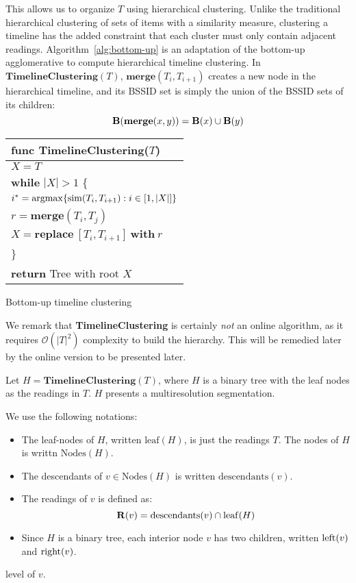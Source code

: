 This allows us to organize $T$ using hierarchical clustering.
Unlike the traditional hierarchical clustering of sets of items with a
similarity measure, clustering a timeline has the added constraint that each
cluster must only contain adjacent readings.
Algorithm~\ref{alg:bottom-up} is an
adaptation of the bottom-up agglomerative to compute hierarchical timeline
clustering.  In $\mathbf{TimelineClustering}(T)$, 
$\mathbf{merge}(T_i, T_{i+1})$ creates a new node in the hierarchical timeline,
and its BSSID set is simply the union of the BSSID sets of its children:
$$\mathbf{B}(\mathbf{merge}(x, y)) = \mathbf{B}(x)\cup\mathbf{B}(y)$$ 

\begin{algorithm}[t]
    \centering
\begin{tabular}{|l|}\hline
    func {\bf TimelineClustering}($T$) \\\hline
    $X = T$ \\
    {\bf while} $|X| > 1$ \{ \\
        \RRR $i^* = \mathrm{argmax}\{\mathrm{sim}(T_i,T_{i+1}) : i\in [1, |X|]\}$ \\
        \RRR $r = \mathbf{merge}(T_i, T_j)$ \\
        \RRR $X = \mathbf{replace}\ [T_i, T_{i+1}]\ \mathbf{with}\ r$\\
    \}\\ 
    {\bf return} Tree with root $X$\\ \hline
\end{tabular}
\vspace{0.5cm}
\caption{Bottom-up timeline clustering}
\label{alg:bottom-up}
\end{algorithm}

We remark that {\bf TimelineClustering} is certainly {\em not} an online
algorithm, as it requires $\mathcal{O}(|T|^2)$ complexity to build the
hierarchy.  This will be remedied later by the online version to be presented
later.

Let $H = \mathbf{TimelineClustering}(T)$, where $H$ is a binary tree with the
leaf nodes as the readings in $T$.
$H$ presents a multiresolution segmentation.

We use the following notations:

\begin{itemize}
    \item The leaf-nodes of $H$, written $\mathrm{leaf}(H)$, is just the
        readings $T$.  The nodes of $H$ is writtn $\mathrm{Nodes}(H)$.
    \item The descendants of $v\in \mathrm{Nodes}(H)$ is written
        $\mathrm{descendants}(v)$.
    \item The readings of $v$ is defined as:
        $$\mathbf{R}(v) = \mathrm{descendants}(v)\cap\mathrm{leaf}(H)$$
    \item Since $H$ is a binary tree, each interior node $v$ has two children,
        written $\mathrm{left}(v)$ and $\mathrm{right}(v)$.
\end{itemize}
level of $v$.

